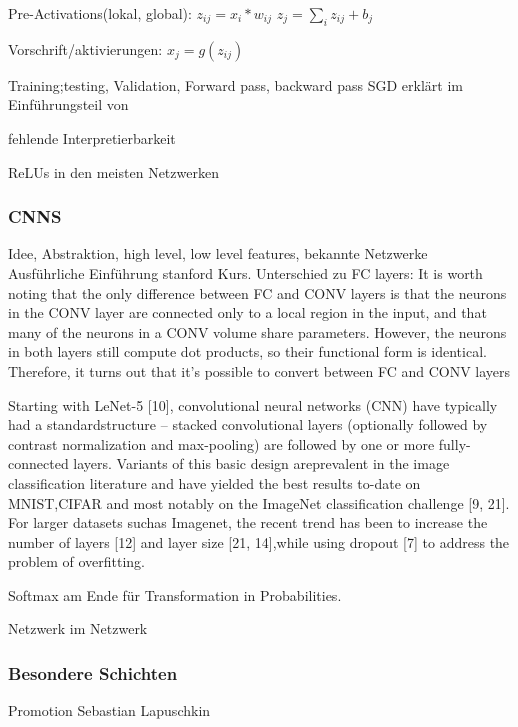 \documentclass[twoside, 12pt,a4paper]{article}
\numberwithin{equation}{section}
\begin{document}
	Pre-Activations(lokal, global): $z_{ij} = x_i*w_{ij}$
	$z_j = \sum_iz_{ij} + b_j$
	
	Vorschrift/aktivierungen: $x_j = g(z_{ij})$
	
	
	Training;testing, Validation, Forward pass, backward pass
	SGD erklärt im Einführungsteil von \cite{BatchNormalization}

	fehlende Interpretierbarkeit
	
	ReLUs in den meisten Netzwerken
	
	
	\subsubsection{CNNS}
	Idee, Abstraktion, high level, low level features, bekannte Netzwerke\\
	
	Ausführliche Einführung stanford Kurs\cite{cnn_stanford}. Unterschied zu FC layers: 
	It is worth noting that the only difference between FC and CONV layers is that the neurons in the CONV layer are connected only to a local region in the input, and that many of the neurons in a CONV volume share parameters. However, the neurons in both layers still compute dot products, so their functional form is identical. Therefore, it turns out that it’s possible to convert between FC and CONV layers
	
	Starting with LeNet-5   [10], convolutional neural networks (CNN) have typically had a standardstructure – stacked convolutional layers (optionally followed by contrast normalization and max-pooling)  are  followed  by  one  or  more  fully-connected  layers.   Variants  of  this  basic  design  areprevalent in the image classification literature and have yielded the best results to-date on MNIST,CIFAR and most notably on the ImageNet classification challenge [9, 21].  For larger datasets suchas Imagenet, the recent trend has been to increase the number of layers  [12] and layer size [21, 14],while using dropout [7] to address the problem of overfitting.\cite{goingdeeperwithconvolutions}
	
	Softmax am Ende für Transformation in Probabilities.
	
	Netzwerk im Netzwerk \cite{cnn_architectures_stanford, goingdeeperwithconvolutions}
	
	\subsubsection{Besondere Schichten}
	Promotion Sebastian Lapuschkin
	
\end{document}
